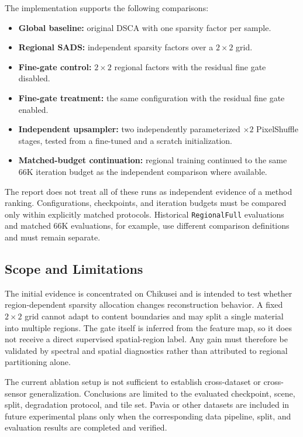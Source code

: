 \documentclass[10pt,twocolumn,letterpaper]{article}
\begin{document}
The implementation supports the following comparisons:

\begin{itemize}
    \item \textbf{Global baseline:} original DSCA with one sparsity factor per sample.
    \item \textbf{Regional SADS:} independent sparsity factors over a $2\times2$ grid.
    \item \textbf{Fine-gate control:} $2\times2$ regional factors with the residual fine gate disabled.
    \item \textbf{Fine-gate treatment:} the same configuration with the residual fine gate enabled.
    \item \textbf{Independent upsampler:} two independently parameterized $\times2$ PixelShuffle stages, tested from a fine-tuned and a scratch initialization.
    \item \textbf{Matched-budget continuation:} regional training continued to the same 66K iteration budget as the independent comparison where available.
\end{itemize}

The report does not treat all of these runs as independent evidence of a method ranking. Configurations, checkpoints, and iteration budgets must be compared only within explicitly matched protocols. Historical \texttt{RegionalFull} evaluations and matched 66K evaluations, for example, use different comparison definitions and must remain separate.

\subsection{Scope and Limitations}

The initial evidence is concentrated on Chikusei and is intended to test whether region-dependent sparsity allocation changes reconstruction behavior. A fixed $2\times2$ grid cannot adapt to content boundaries and may split a single material into multiple regions. The gate itself is inferred from the feature map, so it does not receive a direct supervised spatial-region label. Any gain must therefore be validated by spectral and spatial diagnostics rather than attributed to regional partitioning alone.

The current ablation setup is not sufficient to establish cross-dataset or cross-sensor generalization. Conclusions are limited to the evaluated checkpoint, scene, split, degradation protocol, and tile set. Pavia or other datasets are included in future experimental plans only when the corresponding data pipeline, split, and evaluation results are completed and verified.
\end{document}
